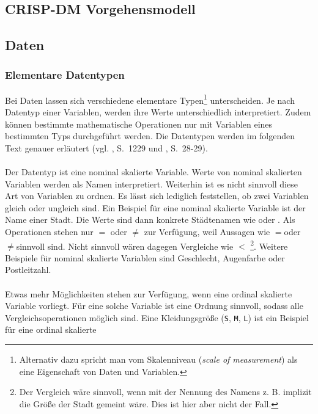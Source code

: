 \subsection{CRISP-DM Vorgehensmodell}

\subsection{Daten}

\subsubsection{Elementare Datentypen}

Bei Daten lassen sich verschiedene elementare Typen\footnote{Alternativ dazu
spricht man vom Skalenniveau (\emph{scale of measurement}) als eine
Eigenschaft von Daten und Variablen.} unterscheiden.
Je nach Datentyp einer
Variablen, werden ihre Werte unterschiedlich interpretiert. Zudem können
bestimmte mathematische Operationen nur mit Variablen eines bestimmten Typs
durchgeführt werden. Die Datentypen werden im folgenden Text genauer erläutert
(vgl. \cite{Arens}, S.~1229 und \cite{McCarthy}, S.~28-29).\\ \\
Der \grqq Datentyp ist eine nominal skalierte Variable. 
Werte von nominal skalierten Variablen werden als Namen
interpretiert. Weiterhin ist es nicht sinnvoll diese Art von Variablen zu
ordnen. Es lässt sich lediglich feststellen, ob zwei Variablen
gleich oder ungleich sind. Ein Beispiel für eine nominal skalierte Variable ist
der Name einer Stadt. Die Werte sind dann konkrete Städtenamen wie
\grqq oder \grqq. Als Operationen stehen nur $=$
oder $\neq$ zur Verfügung, weil Aussagen wie 
\grqq$=$\grqq oder
\grqq$\neq$\grqq sinnvoll sind. Nicht sinnvoll wären
dagegen Vergleiche wie \grqq$<$\grqq
\footnote{Der Vergleich wäre sinnvoll, wenn mit der Nennung des Namens 
z. B. implizit die Größe der Stadt gemeint wäre. Dies ist hier aber nicht der
Fall.}.
Weitere Beispiele für nominal skalierte Variablen sind Geschlecht, Augenfarbe
oder Postleitzahl. \\ \\
Etwas mehr Möglichkeiten stehen zur Verfügung, wenn eine ordinal skalierte
Variable vorliegt. Für eine solche Variable ist eine Ordnung sinnvoll, sodass
alle Vergleichsoperationen möglich sind. Eine Kleidungsgröße (\texttt{S},
\texttt{M}, \texttt{L}) ist ein Beispiel für eine ordinal skalierte
